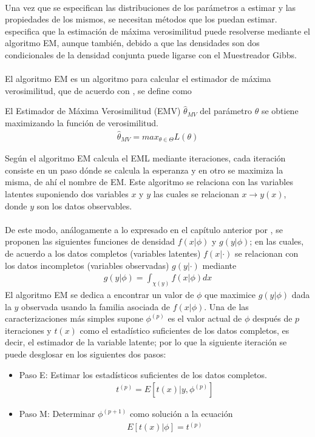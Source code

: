 \\
Una vez que se especifican las distribuciones de los par\'ametros a estimar y las propiedades de los mismos, se necesitan m\'etodos que los puedan estimar. \cite{pitt2002constructing} especifica que la estimaci\'on de m\'axima verosimilitud puede resolverse mediante el algoritmo EM, aunque tambi\'en, debido a que las densidades son dos condicionales de la densidad conjunta puede ligarse con el Muestreador Gibbs.\\
\\
El algoritmo EM es un algoritmo para calcular el estimador de m\'axima verosimilitud, que de acuerdo con \cite{held2014applied}, se define como
\begin{defi}
El Estimador de M\'axima Verosimilitud (EMV) $\hat{\theta}_{MV}$ del par\'ametro $\theta$ se obtiene maximizando la funci\'on de verosimilitud.
\begin{align*}
\hat{\theta}_{MV}=max_{\theta \in \Theta} L(\theta)
\end{align*} 
\end{defi}
Seg\'un \cite{dempster1977maximum} el algoritmo EM calcula el EML mediante iteraciones, cada iteraci\'on consiste en un paso d\'onde se calcula la esperanza y en otro  se maximiza la misma, de ah\'i el nombre de EM. Este algoritmo se relaciona con las variables latentes suponiendo dos variables $x$ y $y$ las cuales se relacionan $x \to y(x)$, donde $y$ son los datos observables.\\
\\
De este modo, an\'alogamente a lo expresado en el cap\'itulo anterior por \cite{pitt2002constructing}, se proponen las siguientes funciones de densidad $f(x|\phi)$ y $g(y|\phi)$; en las cuales, de acuerdo a \cite{dempster1977maximum} los datos completos (variables latentes) $f(x|\cdot)$ se relacionan con los datos incompletos (variables observadas) $g(y|\cdot)$ mediante
\begin{align*}
g(y|\phi)=\int_{\chi(y)} f(x|\phi)dx
\end{align*}
El algoritmo EM se dedica a encontrar un valor de $\phi$ que maximice $g(y|\phi)$ dada la $y$ observada usando la familia asociada de $f(x|\phi)$. Una de las caracterizaciones m\'as simples supone $\phi^{(p)}$ es el valor actual de $\phi$ despu\'es de $p$ iteraciones y $t(x)$ como el estad\'istico suficientes de los datos completos, es decir, el estimador de la variable latente; por lo que la siguiente iteraci\'on se puede desglosar en los siguientes dos pasos:
\begin{itemize}
\item Paso E: Estimar los estad\'isticos suficientes de los datos completos.
	\begin{align*}
	t^{(p)}=E[t(x)|y,\phi^{(p)}]
	\end{align*}
\item Paso M: Determinar $\phi^{(p+1)}$ como soluci\'on a la ecuaci\'on
	\begin{align*}
	E[t(x)|\phi]=t^{(p)}
	\end{align*}
\end{itemize}
